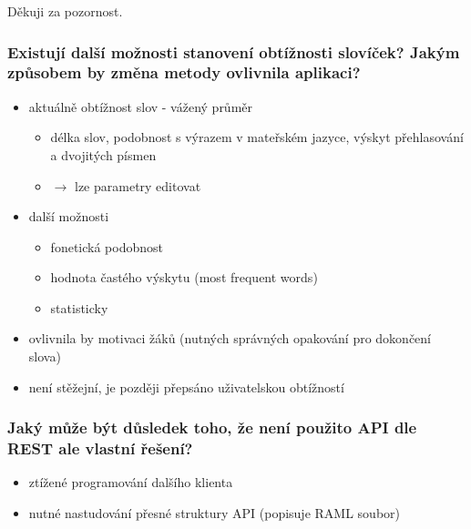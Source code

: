 \begin{frame}
\begin{center}
\label{lastslide}
\huge Děkuji za pozornost.
\end{center}
\end{frame}

\begin{frame}[noframenumbering]
    \frametitle{Existují další možnosti stanovení obtížnosti slovíček? Jakým způsobem by změna metody ovlivnila aplikaci?}

    \begin{itemize}
        \item aktuálně obtížnost slov - vážený průměr
        \begin{itemize}
            \item délka slov, podobnost s výrazem v mateřském jazyce, výskyt přehlasování a dvojitých písmen
            \item $\rightarrow$ lze parametry editovat
        \end{itemize}
        \item další možnosti
        \begin{itemize}
            \item fonetická podobnost
            \item hodnota častého výskytu (most frequent words)
            \item statisticky
        \end{itemize}
        \item ovlivnila by motivaci žáků (nutných správných opakování pro dokončení slova)
        \item není stěžejní, je později přepsáno uživatelskou obtížností
    \end{itemize}
\end{frame}

\begin{frame}[noframenumbering]
    \frametitle{Jaký může být důsledek toho, že není použito API dle REST ale vlastní řešení?}
    \begin{itemize}
        \item ztížené programování dalšího klienta 
        \item nutné nastudování přesné struktury API (popisuje RAML soubor)
    \end{itemize}
\end{frame}

